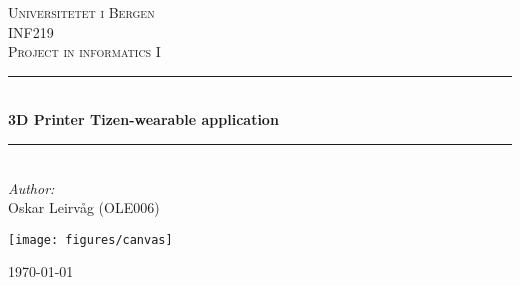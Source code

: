 \begin{titlepage}


    \newcommand{\HRule}{\rule{\linewidth}{0.5mm}} %

    \center %


    \textsc{\LARGE Universitetet i Bergen}\\[1.5cm] %
    \textsc{\Large INF219}\\[0.5cm] %
    \textsc{\large Project in informatics I}\\[0.5cm] %


    \HRule \\[0.4cm]
    { \huge \bfseries 3D Printer Tizen-wearable application}\\[0.4cm] %
    \HRule \\[1.5cm]

    \Large \emph{Author:}\\
    Oskar Leirvåg (OLE006)
    \\[2cm] %
    \centerline{\texttt{[image: figures/canvas]}} %

    {\large \today}\\[3cm] %


    \vfill

\end{titlepage}